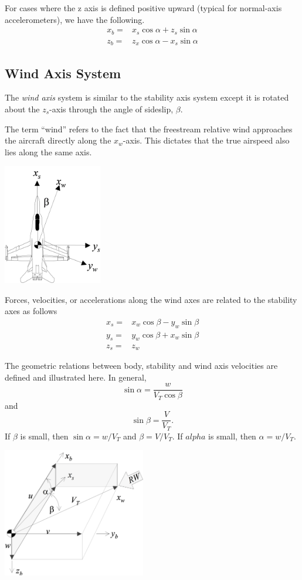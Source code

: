 \documentclass[
]{book}
\begin{document}
For cases where the z axis is defined positive upward (typical for normal-axis accelerometers), we have the following.
\[
\begin{align}
x_b =& x_s \cos \alpha + z_s \sin \alpha \\
z_b =& z_x \cos \alpha - x_s \sin \alpha
\end{align}
\]

\hypertarget{wind-axis-system}{%
\subsection{Wind Axis System}\label{wind-axis-system}}

The \emph{wind axis} system is similar to the stability axis system except it is rotated about the \(z_s\)-axis through the angle of sideslip, \(\beta\).

The term ``wind'' refers to the fact that the freestream relative wind approaches the aircraft directly along the \(x_w\)-axis. This dictates that the true airspeed also lies along the same axis.

\includegraphics[width=1.69931in,height=2.07014in]{media/06/image5.svg}

Forces, velocities, or accelerations along the wind axes are related to the stability axes as follows
\[
\begin{align}
x_s =&x_w \cos \beta - y_w \sin \beta \\
y_s =& y_w \cos \beta + x_w \sin \beta \\
z_s =& z_w
\end{align}
\]

The geometric relations between body, stability and wind axis velocities are defined and illustrated here. In general,
\[ \sin \alpha = \frac{w}{V_T \cos \beta}\] and
\[\sin \beta = \frac{V}{V_T}.\]
If \(\beta\) is small, then \(\sin \alpha = w/V_T\) and \(\beta = V / V_T\). If \(alpha\) is small, then \(\alpha = w/V_T\).

\includegraphics[width=2.45903in,height=2.21875in]{media/06/image6.svg}
\end{document}
